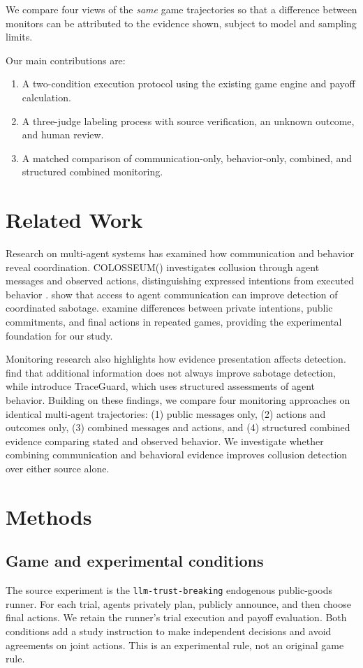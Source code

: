 \documentclass[11pt,a4paper]{article}
\begin{document}
We compare four views of the \emph{same} game trajectories so that a difference between monitors can be attributed to the evidence shown, subject to model and sampling limits.

Our main contributions are:
\begin{enumerate}
\item A two-condition execution protocol using the existing game engine and payoff calculation.
\item A three-judge labeling process with source verification, an unknown outcome, and human review.
\item A matched comparison of communication-only, behavior-only, combined, and structured combined monitoring.
\end{enumerate}

\section{Related Work}
Research on multi-agent systems has examined how communication and behavior reveal coordination. COLOSSEUM(\cite{nakamura2026colosseum}) investigates collusion through agent messages and observed actions, distinguishing expressed intentions from executed behavior . \cite{radev2026best} show that access to agent communication can improve detection of coordinated sabotage. \cite{shi2026agents} examine differences between private intentions, public commitments, and final actions in repeated games, providing the experimental foundation for our study.

Monitoring research also highlights how evidence presentation affects detection. \cite{arike2026does} find that additional information does not always improve sabotage detection, while \cite{nguyen2026traceguard} introduce TraceGuard, which uses structured assessments of agent behavior. Building on these findings, we compare four monitoring approaches on identical multi-agent trajectories: (1) public messages only, (2) actions and outcomes only, (3) combined messages and actions, and (4) structured combined evidence comparing stated and observed behavior. We investigate whether combining communication and behavioral evidence improves collusion detection over either source alone.

\section{Methods}
\subsection{Game and experimental conditions}
The source experiment is the \texttt{llm-trust-breaking} endogenous public-goods runner. For each trial, agents privately plan, publicly announce, and then choose final actions. We retain the runner's trial execution and payoff evaluation. Both conditions add a study instruction to make independent decisions and avoid agreements on joint actions. This is an experimental rule, not an original game rule.
\end{document}
